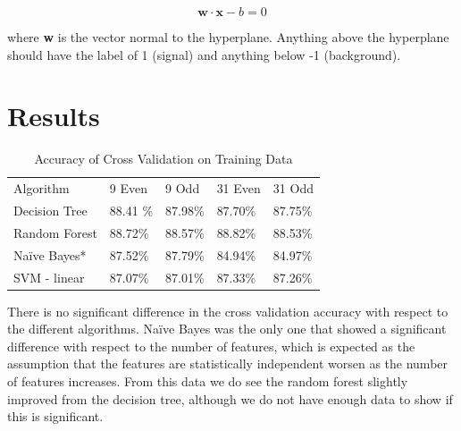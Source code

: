 \documentclass[aps, reprint, amsmath, amssymb]{revtex4-1}
\begin{document}
\begin{equation}
\mathbf{w} \cdot \mathbf{x} - b = 0
\end{equation}

where \textbf{w} is the vector normal to the hyperplane.  Anything above the hyperplane should have the label of 1 (signal) and anything below -1 (background).  

\section{Results}

\begin{table}[H]
  \begin{center}
    \caption{Accuracy of Cross Validation on Training Data} \label{tab:title} 
    \begin{tabular}{ | l || l | l | l | l |}
      \hline
      Algorithm & 9 Even & 9 Odd & 31 Even & 31 Odd \\ \hhline{|=||=|=|=|=|}
      Decision Tree & 88.41 \% & 87.98\% & 87.70\% & 87.75\% \\ \hline
      Random Forest & 88.72\% & 88.57\% &  88.82\% & 88.53\% \\ \hline
      Na{\"i}ve Bayes* & 87.52\% & 87.79\% & 84.94\% & 84.97\% \\ \hline
      SVM - linear & 87.07\% & 87.01\% & 87.33\% & 87.26\% \\ \hline
    \end{tabular}
  \end{center}
\end{table}

There is no significant difference in the cross validation accuracy with respect to the different algorithms.  Na{\"i}ve Bayes was the only one that showed a significant difference with respect to the number of features, which is expected as the assumption that the features are statistically independent worsen as the number of features increases.  From this data we do see the random forest slightly improved from the decision tree, although we do not have enough data to show if this is significant. 
\end{document}
